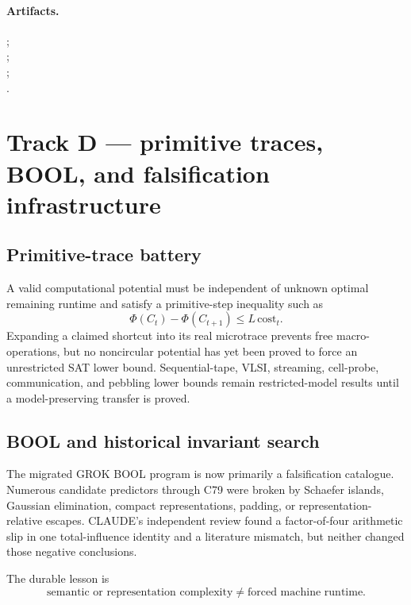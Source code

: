 \documentclass[11pt]{article}
\begin{document}
\paragraph{Artifacts.}
;\\
;\\
;\\
.

\section{Track D --- primitive traces, BOOL, and falsification infrastructure}

\subsection{Primitive-trace battery}

A valid computational potential must be independent of unknown optimal remaining runtime and satisfy
a primitive-step inequality such as
\[
\Phi(C_t)-\Phi(C_{t+1})\le L\,\mathrm{cost}_t.
\]
Expanding a claimed shortcut into its real microtrace prevents free macro-operations, but no
noncircular potential has yet been proved to force an unrestricted SAT lower bound. Sequential-tape,
VLSI, streaming, cell-probe, communication, and pebbling lower bounds remain restricted-model
results until a model-preserving transfer is proved.

\subsection{BOOL and historical invariant search}

The migrated GROK BOOL program is now primarily a falsification catalogue. Numerous candidate
predictors through C79 were broken by Schaefer islands, Gaussian elimination, compact
representations, padding, or representation-relative escapes. CLAUDE's independent review found a
factor-of-four arithmetic slip in one total-influence identity and a literature mismatch, but neither
changed those negative conclusions.

The durable lesson is
\[
\boxed{\text{semantic or representation complexity}\ne\text{forced machine runtime}.}
\]
\end{document}
